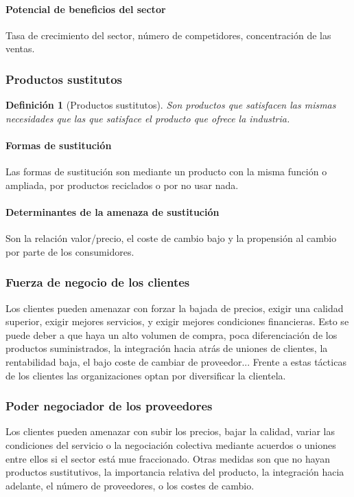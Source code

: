 \documentclass[12pt]{article}
\theoremstyle{definition_wo_parentheses}
\newtheorem{definicion}{Definición}[section]
\begin{document}
\paragraph{Potencial de beneficios del sector} Tasa de crecimiento del sector, número de competidores, concentración de las ventas.

\subsubsection{Productos sustitutos}

\begin{definicion}[Productos sustitutos]
Son productos que satisfacen las mismas necesidades que las que satisface el producto que ofrece la industria.
\end{definicion}

\paragraph{Formas de sustitución} Las formas de sustitución son mediante un producto con la misma función o ampliada, por productos reciclados o por no usar nada.

\paragraph{Determinantes de la amenaza de sustitución} Son la relación valor/precio, el coste de cambio bajo y la propensión al cambio por parte de los consumidores.

\subsubsection{Fuerza de negocio de los clientes}

Los clientes pueden amenazar con forzar la bajada de precios, exigir una calidad superior, exigir mejores servicios, y exigir mejores condiciones financieras. Esto se puede deber a que haya un alto volumen de compra, poca diferenciación de los productos suministrados, la integración hacia atrás de uniones de clientes, la rentabilidad baja, el bajo coste de cambiar de proveedor... Frente a estas tácticas de los clientes las organizaciones optan por diversificar la clientela.

\subsubsection{Poder negociador de los proveedores}

Los clientes pueden amenazar con subir los precios, bajar la calidad, variar las condiciones del servicio o la negociación colectiva mediante acuerdos o uniones entre ellos si el sector está mue fraccionado. Otras medidas son que no hayan productos sustitutivos, la importancia relativa del producto, la integración hacia adelante, el número de proveedores, o los costes de cambio.
\end{document}

